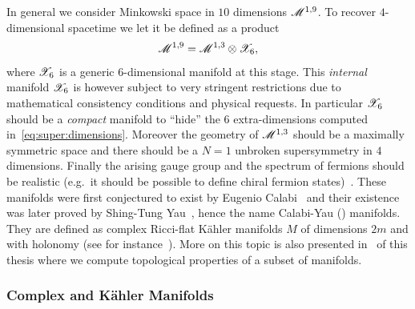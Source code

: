 In general we consider Minkowski space in $10$ dimensions $\mathscr{M}^{1,9}$.
To recover $4$-dimensional spacetime we let it be defined as a product
\begin{equation}
  \mathscr{M}^{1,9} = \mathscr{M}^{1,3} \otimes \mathscr{X}_6,
\end{equation}
where $\mathscr{X}_6$ is a generic $6$-dimensional manifold at this stage.
This \emph{internal} manifold $\mathscr{X}_6$ is however subject to very stringent restrictions due to mathematical consistency conditions and physical requests.
In particular $\mathscr{X}_6$ should be a \emph{compact} manifold to ``hide'' the 6 extra-dimensions computed in~\eqref{eq:super:dimensions}.\footnotemark{}
Moreover the geometry of $\mathscr{M}^{1,3}$ should be a maximally symmetric space and there should be a $N = 1$ unbroken supersymmetry in $4$ dimensions.
Finally the arising gauge group and the spectrum of fermions should be realistic (e.g.\ it should be possible to define chiral fermion states)~\cite{Candelas:1985:VacuumConfigurationsSuperstrings}.
These manifolds were first conjectured to exist by Eugenio Calabi~\cite{Calabi:1957:KahlerManifoldsVanishing} and their existence was later proved by Shing-Tung Yau~\cite{Yau:1977:CalabiConjectureNew}, hence the name Calabi-Yau (\cy) manifolds.
They are defined as complex Ricci-flat Kähler manifolds $M$ of dimensions $2m$ and with holonomy  (see for instance~\cite{Joyce:2000:CompactManifoldsSpecial,Joyce:2002:LecturesCalabiYauSpecial,Greene:1997:StringTheoryCalabiYau}).
More on this topic is also presented in~ of this thesis where we compute topological properties of a subset of \cy manifolds.


\subsubsection{Complex and Kähler Manifolds}

